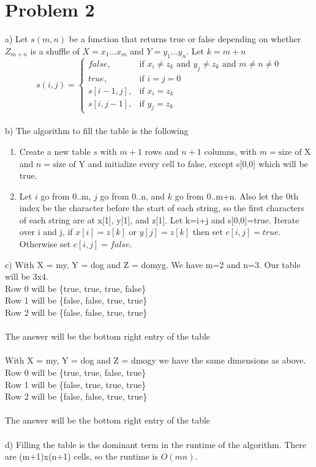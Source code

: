 \documentclass{article}
\begin{document}
\section*{Problem 2}
a) Let $s(m,n)$ be a function that returns true or false depending on whether $Z_{m+n}$ is a shuffle of $X = x_1 ... x_m$ and $Y = y_1 ... y_n$.  Let $k=m+n$
\[
    s(i,j)= 
\begin{cases}
    false,& \text{if } x_i\neq z_k \text{ and } y_j\neq z_k \text{ and } m\neq n\neq 0\\
    true,& \text{if } i=j=0\\
    s[i-1, j],& \text{if } x_i=z_k\\
    s[i, j-1],& \text{if } y_j=z_k
\end{cases}
\]\\
b) The algorithm to fill the table is the following
\begin{enumerate}
  \item Create a new table $s$ with $m+1$ rows and $n+1$ columns, with $m=\text{size of X}$ and $n=\text{size of Y}$ and initialize every cell to false, except s[0,0] which will be true.
  \item Let $i$ go from 0..m, $j$ go from 0..n, and $k$ go from 0..m+n. Also let the 0th index be the character before the start of each string, so the first characters of each string are at x[1], y[1], and z[1]. Let k=i+j and s[0,0]=true. Iterate over i and j, if $x[i]=z[k]$ or $y[j]=z[k]$ then set $c[i,j]=true$. Otherwise set $c[i,j]=false$.
\end{enumerate}
c) With X = my, Y = dog and Z = domyg. We have m=2 and n=3.  Our table will be 3x4.\\
Row 0 will be \{true, true, true, false\}\\
Row 1 will be \{false, false, true, true\}\\
Row 2 will be \{false, false, true, true\}\\\\
The answer will be the bottom right entry of the table\\\\
With X = my, Y = dog and Z = dmogy we have the same dimensions as above.\\
Row 0 will be \{true, true, false, true\}\\
Row 1 will be \{false, true, true, true\}\\
Row 2 will be \{false, false, true, true\}\\\\
The answer will be the bottom right entry of the table\\\\
d) Filling the table is the dominant term in the runtime of the algorithm.  There are (m+1)x(n+1) cells, so the runtime is $O(mn)$.\\
\end{document}
